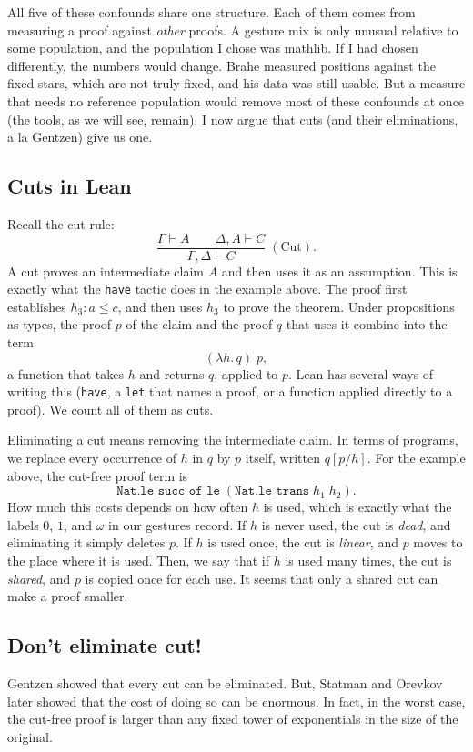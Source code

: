 \documentclass{article}
\begin{document}
All five of these confounds share one structure. Each of them comes from measuring a proof against \textit{other} proofs. 
A gesture mix is only unusual relative to some population, and the population I chose was mathlib. If I had chosen 
differently, the numbers would change. Brahe measured positions against the fixed stars, which are not truly fixed, and 
his data was still usable. But a measure that needs no reference population would remove most of these confounds at once (the tools, as we
will see, remain). I now argue that cuts (and their eliminations, a la Gentzen) give us one.
\subsection{Cuts in Lean}

Recall the cut rule:
\[
\frac{\Gamma\vdash A\qquad\Delta,A\vdash C}
     {\Gamma,\Delta\vdash C}\;(\mathrm{Cut}).
\]
A cut proves an intermediate claim $A$ and then uses it as an assumption. This is exactly what the \texttt{have}
tactic does in the example above. The proof first establishes $h_3 : a\leq c$, and then uses $h_3$ to prove the
theorem. Under propositions as types, the proof $p$ of the claim and the proof $q$ that uses it combine into the term
\[
(\lambda h.\,q)\;p,
\]
a function that takes $h$ and returns $q$, applied to $p$. Lean has several ways of writing this (\texttt{have}, a
\texttt{let} that names a proof, or a function applied directly to a proof). We count all of them as cuts.

Eliminating a cut means removing the intermediate claim. In terms of programs, we replace every occurrence of $h$ in
$q$ by $p$ itself, written $q[p/h]$. For the example above, the cut-free proof term is
\[
\mathtt{Nat.le\_succ\_of\_le}\;(\mathtt{Nat.le\_trans}\;h_1\;h_2).
\]
How much this costs depends on how often $h$ is used, which is exactly what the labels $0$, $1$, and $\omega$ in our
gestures record. If $h$ is never used, the cut is \textit{dead}, and eliminating it simply deletes $p$. If $h$ is used
once, the cut is \textit{linear}, and $p$ moves to the place where it is used. Then, we say that if $h$ is used many
times, the cut is \textit{shared}, and $p$ is copied once for each use. It seems that only a shared cut can make a proof smaller.

\subsection{Don't eliminate cut!}
Gentzen showed that every cut can be eliminated. But, Statman and Orevkov \textit{\parencite{statman1979herbrand,statman1979lambda,orevkov1982}} later showed that the cost of doing so can be
enormous. In fact, in the worst case, the cut-free proof is larger than any fixed tower of exponentials in the size of the
original.
\end{document}
